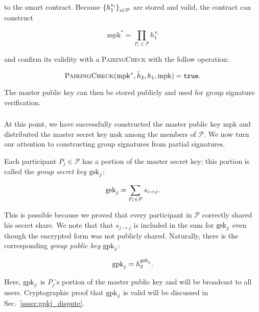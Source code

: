 \noindent
to the smart contract.
Because $\left\{ h_{1}^{s_{i}} \right\}_{i\in\mathcal{P}}$ are stored
and valid, the contract can construct

\begin{equation}
    \text{mpk}^{*} = \prod_{P_{i}\in\mathcal{P}} h_{1}^{s_{i}}
    \label{eq:mpk_dual}
\end{equation}

\noindent
and confirm its validity with a \textsc{PairingCheck}
with the follow operation:

\begin{equation}
    \textsc{PairingCheck}(\text{mpk}^{*},\bar{h}_{2},h_{1},\text{mpk})
        = \texttt{true}.
\end{equation}

\noindent
The master public key can then be stored publicly and used
for group signature verification.



\subsubsection{\GPKSubmission{}}
\label{sssec:gpkj_submission}
At this point, we have successfully constructed the master public
key $\text{mpk}$ and distributed
the master secret key $\text{msk}$ among the members of $\mathcal{P}$.
We now turn our attention to constructing group
signatures from partial signatures.

Each participant $P_{j}\in\mathcal{P}$ has a portion of the
master secret key; this portion is called the \emph{group secret key}
$\textrm{gsk}_{j}$:

\begin{equation}
    \textrm{gsk}_{j} = \sum_{P_{i}\in\mathcal{P}} s_{i\to j}.
\end{equation}

\noindent
This is possible because we proved that every participant
in $\mathcal{P}$ correctly shared his secret share.
We note that that $s_{j\to j}$ is included in the sum for
$\textrm{gsk}_{j}$ even though the encrypted form was not publicly shared.
Naturally, there is the corresponding \emph{group public key}
$\textrm{gpk}_{j}$:

\begin{equation}
    \textrm{gpk}_{j} = h_{2}^{\textrm{gsk}_{j}}.
\end{equation}

\noindent
Here, $\textrm{gpk}_{j}$ is $P_{j}$'s portion of the master public key
and will be broadcast to all users.
Cryptographic proof that $\textrm{gpk}_{j}$ is valid will be discussed
in Sec.~\ref{sssec:gpkj_dispute}.



